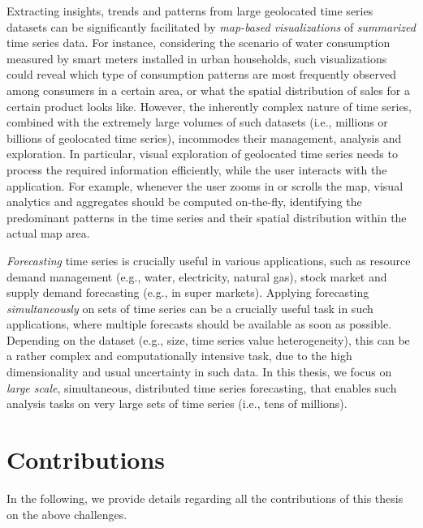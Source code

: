 Extracting insights, trends and patterns from large geolocated time series datasets can be significantly facilitated by \textit{map-based visualizations} of \textit{summarized} time series data. For instance, considering the scenario of water consumption measured by smart meters installed in urban households, such visualizations could reveal which type of consumption patterns are most frequently observed among consumers in a certain area, or what the spatial distribution of sales for a certain product looks like. However, the inherently complex nature of time series, combined with the extremely large volumes of such datasets (i.e., millions or billions of geolocated time series), incommodes their management, analysis and exploration. In particular, visual exploration of geolocated time series needs to process the required information efficiently, while the user interacts with the application. For example, whenever the user zooms in or scrolls the map, visual analytics and aggregates should be computed on-the-fly, identifying the predominant patterns in the time series and their spatial distribution within the actual map area.

\textit{Forecasting} time series is crucially useful in various applications, such as resource demand management (e.g., water, electricity, natural gas), stock market and supply demand forecasting (e.g., in super markets). Applying forecasting \textit{simultaneously} on sets of time series can be a crucially useful task in such applications, where multiple forecasts should be available as soon as possible. Depending on the dataset (e.g., size, time series value heterogeneity), this can be a rather complex and computationally intensive task, due to the high dimensionality and usual uncertainty in such data. In this thesis, we focus on \textit{large scale}, simultaneous, distributed time series forecasting, that enables such analysis tasks on very large sets of time series (i.e., tens of millions).

\section{Contributions}
\label{subsec:contrib}

In the following, we provide details regarding all the contributions of this thesis on the above challenges.

